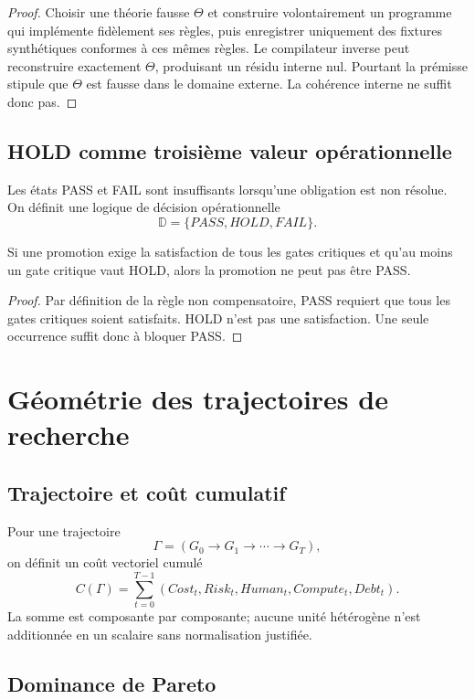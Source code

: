 \begin{proof}
Choisir une théorie fausse $\Theta$ et construire volontairement un programme qui implémente fidèlement ses règles, puis enregistrer uniquement des fixtures synthétiques conformes à ces mêmes règles. Le compilateur inverse peut reconstruire exactement $\Theta$, produisant un résidu interne nul. Pourtant la prémisse stipule que $\Theta$ est fausse dans le domaine externe. La cohérence interne ne suffit donc pas.
\end{proof}

\section{HOLD comme troisième valeur opérationnelle}

Les états PASS et FAIL sont insuffisants lorsqu'une obligation est non résolue. On définit une logique de décision opérationnelle
\[
\mathbb D=\{PASS,HOLD,FAIL\}.
\]

\begin{proposition}
Si une promotion exige la satisfaction de tous les gates critiques et qu'au moins un gate critique vaut HOLD, alors la promotion ne peut pas être PASS.
\end{proposition}

\begin{proof}
Par définition de la règle non compensatoire, PASS requiert que tous les gates critiques soient satisfaits. HOLD n'est pas une satisfaction. Une seule occurrence suffit donc à bloquer PASS.
\end{proof}

\chapter{Géométrie des trajectoires de recherche}

\section{Trajectoire et coût cumulatif}

Pour une trajectoire
\[
\Gamma=(G_0\to G_1\to\cdots\to G_T),
\]
on définit un coût vectoriel cumulé
\[
C(\Gamma)=\sum_{t=0}^{T-1}
(Cost_t,Risk_t,Human_t,Compute_t,Debt_t).
\]
La somme est composante par composante; aucune unité hétérogène n'est additionnée en un scalaire sans normalisation justifiée.

\section{Dominance de Pareto}

